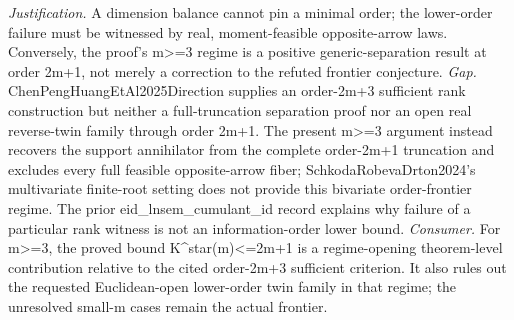 \documentclass{article}
\begin{document}
\par\smallskip\noindent \textit{Justification.} A dimension balance cannot pin a minimal order; the lower-order failure must be witnessed by real, moment-feasible opposite-arrow laws. Conversely, the proof's m>=3 regime is a positive generic-separation result at order 2m+1, not merely a correction to the refuted frontier conjecture. \textit{Gap.} ChenPengHuangEtAl2025Direction supplies an order-2m+3 sufficient rank construction but neither a full-truncation separation proof nor an open real reverse-twin family through order 2m+1. The present m>=3 argument instead recovers the support annihilator from the complete order-2m+1 truncation and excludes every full feasible opposite-arrow fiber; SchkodaRobevaDrton2024's multivariate finite-root setting does not provide this bivariate order-frontier regime. The prior eid_lnsem_cumulant_id record explains why failure of a particular rank witness is not an information-order lower bound. \textit{Consumer.} For m>=3, the proved bound K^star(m)<=2m+1 is a regime-opening theorem-level contribution relative to the cited order-2m+3 sufficient criterion. It also rules out the requested Euclidean-open lower-order twin family in that regime; the unresolved small-m cases remain the actual frontier.
\end{document}
